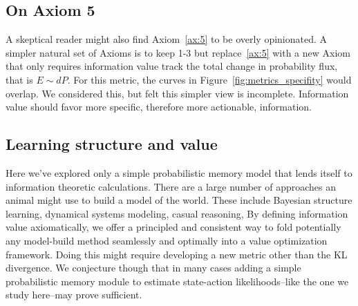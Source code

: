 \documentclass[9pt,twocolumn,twoside]{pnas-new}
\begin{document}
\subsection*{On Axiom 5} 
A skeptical reader might also find Axiom~\ref{ax:5} to be overly opinionated. A simpler natural set of Axioms is to keep 1-3 but replace~\ref{ax:5} with a new Axiom  that only requires information value track the total change in probability flux, that is $E \sim dP$. For this metric, the curves in Figure~\ref{fig:metrics_specifity} would overlap. We considered this, but felt this simpler view is incomplete. Information value should favor more specific, therefore more actionable, information. 


\subsection*{Learning structure and value}
Here we've explored only a simple probabilistic memory model that lends itself to information theoretic calculations. There are a large number of approaches an animal might use to build a model of the world. These include Bayesian structure learning, dynamical systems modeling, casual reasoning, %
By defining information value axiomatically, we offer a principled and consistent way to fold potentially any model-build method seamlessly and optimally into a value optimization framework. Doing this might require developing a new metric other than the KL divergence. We conjecture though that in many cases adding a simple probabilistic memory module to estimate state-action likelihoods--like the one we study here--may prove sufficient.




\end{document}
